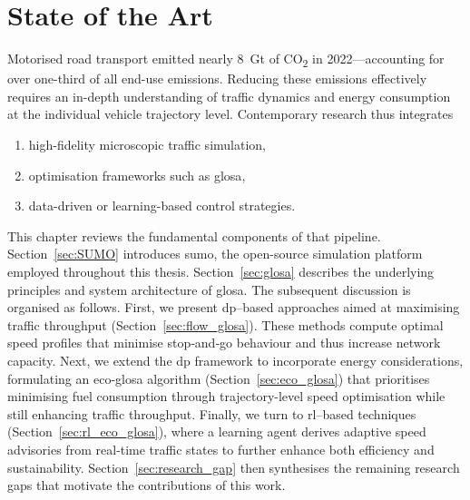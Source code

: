 \chapter{State of the Art}
\label{ch:State_of_the_Art}

Motorised road transport emitted nearly \SI{8}{\giga\tonne} of CO\textsubscript{2} in 2022—accounting for over one-third of all end-use emissions. \cite{IEATransport2024}  
Reducing these emissions effectively requires an in-depth understanding of traffic dynamics and energy consumption at the individual vehicle trajectory level.   
Contemporary research thus integrates  
\begin{enumerate}[label=(\roman*)]
  \item high-fidelity microscopic traffic simulation,
  \item optimisation frameworks such as \ac{glosa},
  \item data-driven or learning-based control strategies.
\end{enumerate}
This chapter reviews the fundamental components of that pipeline. Section~\ref{sec:SUMO} introduces \ac{sumo}, the open-source simulation platform employed throughout this thesis. Section~\ref{sec:glosa} describes the underlying principles and system architecture of \ac{glosa}.
\mynewline
The subsequent discussion is organised as follows. First, we present \ac{dp}–based approaches aimed at maximising traffic throughput (Section~\ref{sec:flow_glosa}). These methods compute optimal speed profiles that minimise stop‐and‐go behaviour and thus increase network capacity. Next, we extend the \ac{dp} framework to incorporate energy considerations, formulating an \ac{eco-glosa} algorithm (Section~\ref{sec:eco_glosa}) that prioritises minimising fuel consumption through trajectory-level speed optimisation while still enhancing traffic throughput. Finally, we turn to \ac{rl}–based techniques (Section~\ref{sec:rl_eco_glosa}), where a learning agent derives adaptive speed advisories from real‐time traffic states to further enhance both efficiency and sustainability.
\mynewline
Section~\ref{sec:research_gap} then synthesises the remaining research gaps that motivate the contributions of this work.  











